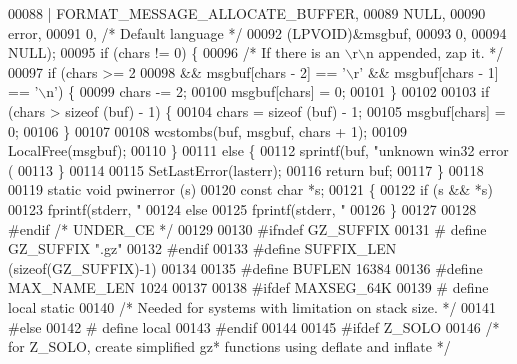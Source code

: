 \begin{DoxyCode}
00088         | FORMAT\_MESSAGE\_ALLOCATE\_BUFFER,
00089         NULL,
00090         error,
00091         0, \textcolor{comment}{/* Default language */}
00092         (LPVOID)&msgbuf,
00093         0,
00094         NULL);
00095     \textcolor{keywordflow}{if} (chars != 0) \{
00096         \textcolor{comment}{/* If there is an \(\backslash\)r\(\backslash\)n appended, zap it.  */}
00097         \textcolor{keywordflow}{if} (chars >= 2
00098             && msgbuf[chars - 2] == \textcolor{charliteral}{'\(\backslash\)r'} && msgbuf[chars - 1] == \textcolor{charliteral}{'\(\backslash\)n'}) \{
00099             chars -= 2;
00100             msgbuf[chars] = 0;
00101         \}
00102 
00103         \textcolor{keywordflow}{if} (chars > \textcolor{keyword}{sizeof} (buf) - 1) \{
00104             chars = \textcolor{keyword}{sizeof} (buf) - 1;
00105             msgbuf[chars] = 0;
00106         \}
00107 
00108         wcstombs(buf, msgbuf, chars + 1);
00109         LocalFree(msgbuf);
00110     \}
00111     \textcolor{keywordflow}{else} \{
00112         sprintf(buf, \textcolor{stringliteral}{"unknown win32 error (%
00113     \}
00114 
00115     SetLastError(lasterr);
00116     \textcolor{keywordflow}{return} buf;
00117 \}
00118 
00119 \textcolor{keyword}{static} \textcolor{keywordtype}{void} pwinerror (s)
00120     \textcolor{keyword}{const} \textcolor{keywordtype}{char} *s;
00121 \{
00122     \textcolor{keywordflow}{if} (s && *s)
00123         fprintf(stderr, \textcolor{stringliteral}{"%
00124     \textcolor{keywordflow}{else}
00125         fprintf(stderr, \textcolor{stringliteral}{"%
00126 \}
00127 
00128 \textcolor{preprocessor}{#endif }\textcolor{comment}{/* UNDER\_CE */}\textcolor{preprocessor}{}
00129 
00130 \textcolor{preprocessor}{#ifndef GZ\_SUFFIX}
00131 \textcolor{preprocessor}{#  define GZ\_SUFFIX ".gz"}
00132 \textcolor{preprocessor}{#endif}
00133 \textcolor{preprocessor}{#define SUFFIX\_LEN (sizeof(GZ\_SUFFIX)-1)}
00134 
00135 \textcolor{preprocessor}{#define BUFLEN      16384}
00136 \textcolor{preprocessor}{#define MAX\_NAME\_LEN 1024}
00137 
00138 \textcolor{preprocessor}{#ifdef MAXSEG\_64K}
00139 \textcolor{preprocessor}{#  define local static}
00140    \textcolor{comment}{/* Needed for systems with limitation on stack size. */}
00141 \textcolor{preprocessor}{#else}
00142 \textcolor{preprocessor}{#  define local}
00143 \textcolor{preprocessor}{#endif}
00144 
00145 \textcolor{preprocessor}{#ifdef Z\_SOLO}
00146 \textcolor{comment}{/* for Z\_SOLO, create simplified gz* functions using deflate and inflate */}
}}}
\end{DoxyCode}
